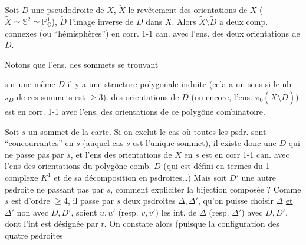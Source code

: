 Soit $D$ une pseudodroite de $X$, $\widetilde X$ le revêtement des
orientations de $X$ ($\widetilde X\simeq\mathbb{S}^2\simeq\mathbb{P}_{\mathbb{C}}^1$), $\widetilde D$ l'image inverse
de $D$ dans $X$. Alors $\widetilde X\setminus\widetilde D$ a deux comp.
connexes (ou ``hémisphères'') en corr. 1-1 can.
avec l'ens. des deux orientations de $D$.

Notons que  l'ens. des sommets se trouvant

sur une même $D$ il y a une structure
polygonale induite (cela a un sens  si
le nb $s_D$ de ces sommets est $\geq3$).  des
orientations de $D$ (ou encore, l'ens. $\pi_0(\widetilde X\setminus\widetilde D)$)
est en corr. 1-1 avec l'ens. des orientations
 de ce polygône combinatoire. 

Soit $s$ un sommet de la carte. Si on exclut le
cas où toutes les psdr. sont ``concourrantes'' en $s$
(auquel cas $s$ est l'unique sommet), il
existe donc une $D$ qui ne passe pas par $s$,
et l'ens  des orientations de $X$ en $s$ est en
corr 1-1 can. avec l'ens  des orientations
du polygône comb. $D$ (qui est défini en
termes du 1-complexe $K^1$ et de sa décomposition en psdroites\ldots) Mais soit $D'$ 
une autre psdroite ne passant pas par $s$, comment
expliciter la bijection composée
?  Comme $s$ est d'ordre $\geq4$,
il passe par $s$ deux psdroites $\Delta,\Delta'$,  
qu'on puisse  choisir $\Delta$ \uline{et} $\Delta'$ non  avec $D,D'$, soient
$u,u'$ (resp. $v,v'$) les int. de $\Delta$ (resp. $\Delta'$) avec $D,D'$,
dont l'int est désignée par $t$. On constate alors
(puisque la configuration des quatre psdroites

